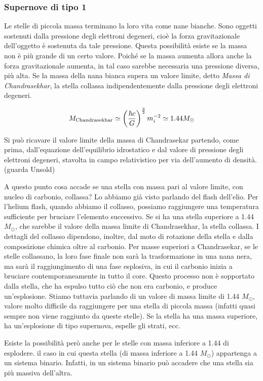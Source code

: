 \subsubsection{Supernove di tipo 1}
Le stelle di piccola massa terminano la loro vita come nane bianche. Sono oggetti sostenuti dalla pressione degli elettroni degeneri, cioè la forza gravitazionale dell'oggetto è sostenuta da tale pressione. Questa possibilità esiste se la massa non è più grande di un certo valore. Poiché se la massa aumenta allora anche la forza gravitazionale aumenta, in tal caso sarebbe necessaria una pressione diversa, più alta. Se la massa della nana bianca supera un valore limite, detto \textit{Massa di Chandrasekhar}, la stella collassa indipendentemente dalla pressione degli elettroni degeneri.

$$M_{\rm Chandrasekhar} \simeq \left( \frac{\hbar c}{G} \right)^{\frac{3}{2}} m_{i}^{-2} \simeq 1.44 M_{\odot}$$

Si può ricavare il valore limite della massa di Chandrasekar partendo, come prima, dall'equazione dell'equilibrio idrostatico e dal valore di pressione degli elettroni degeneri, stavolta in campo relativistico per via dell'aumento di densità.(guarda Unsold)

A questo punto cosa accade se una stella con massa pari al valore limite, con nucleo di carbonio, collassa? Lo abbiamo già visto parlando del flash dell'elio. Per l'helium flash, quando abbiamo il collasso, possiamo raggiungere una temperatura sufficiente per bruciare l'elemento successivo. Se si ha una stella superiore a 1.44 $M_{\odot}$, che sarebbe il valore della massa limite di Chandrasekhar, la stella collassa. I dettagli del collasso dipendono, inoltre, dal moto di rotazione della stella e dalla composizione chimica oltre al carbonio. Per masse superiori a Chandrasekar, se le stelle collassano, la loro fase finale non sarà la trasformazione in una nana nera, ma sarà il raggiungimento di una fase esplosiva, in cui il carbonio inizia a bruciare contemporaneamente in tutto il core. Questo processo non è sopportato dalla stella, che ha espulso tutto ciò che non era carbonio, e produce un'esplosione. Stiamo tuttavia parlando di un valore di massa limite di 1.44 $M_{\odot}$, valore molto difficile da raggiungere per una stella di piccola massa (infatti quasi sempre non viene raggiunto da queste stelle). Se la stella ha una massa superiore, ha un'esplosione di tipo supernova, espelle gli strati, ecc.

Esiste la possibilità però anche per le stelle con massa inferiore a 1.44 di esplodere. \E il caso in cui questa stella (di massa inferiore a 1.44 $M_{\odot}$) appartenga a un sistema binario. Infatti, in un sistema binario può accadere che una stella sia più massiva dell'altra.

